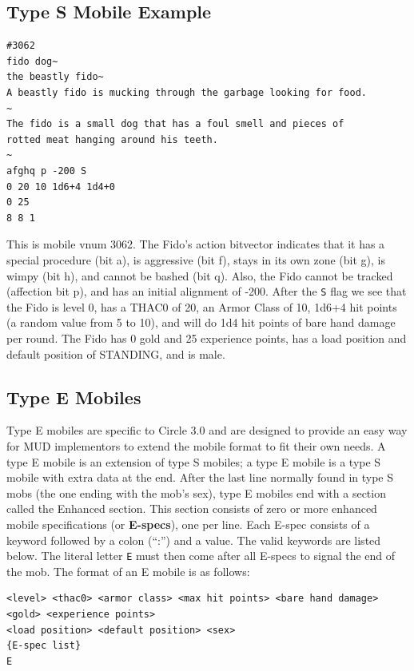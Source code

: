 \documentclass[11pt]{article}
\begin{document}
\subsection{Type S Mobile Example}
\begin{verbatim}
#3062
fido dog~
the beastly fido~
A beastly fido is mucking through the garbage looking for food.
~
The fido is a small dog that has a foul smell and pieces of
rotted meat hanging around his teeth.
~
afghq p -200 S
0 20 10 1d6+4 1d4+0
0 25
8 8 1
\end{verbatim}
\par This is mobile vnum 3062.  The Fido's action bitvector indicates that it has a special procedure (bit a), is aggressive (bit f), stays in its own zone (bit g), is wimpy (bit h), and cannot be bashed (bit q). Also, the Fido cannot be tracked (affection bit p), and has an initial alignment of -200. After the \texttt{S} flag we see that the Fido is level 0, has a THAC0 of 20, an Armor Class of 10, 1d6+4 hit points (a random value from 5 to 10), and will do 1d4 hit points of bare hand damage per round.  The Fido has 0 gold and 25 experience points, has a load position and default position of STANDING, and is male.

\subsection{Type E Mobiles}
Type E mobiles are specific to Circle 3.0 and are designed to provide an easy way for MUD implementors to extend the mobile format to fit their own needs.  A type E mobile is an extension of type S mobiles; a type E mobile is a type S mobile with extra data at the end.  After the last line normally found in type S mobs (the one ending with the mob's sex), type E mobiles end with a section called the Enhanced section.  This section consists of zero or more enhanced mobile specifications (or {\bf E-specs}), one per line.  Each E-spec consists of a keyword followed by a colon (``:'') and a value.  The valid keywords are listed below.  The literal letter \texttt{E} must then come after all E-specs to signal the end of the mob.\newline
The format of an E mobile is as follows:
\begin{verbatim}
<level> <thac0> <armor class> <max hit points> <bare hand damage>
<gold> <experience points>
<load position> <default position> <sex>
{E-spec list}
E
\end{verbatim}
\end{document}
